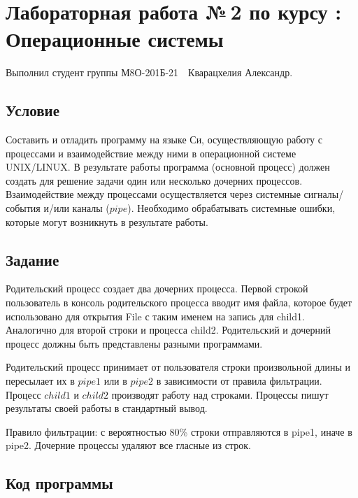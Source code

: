\documentclass[12pt]{article}
\begin{document}
	
	\section*{\centering Лабораторная работа №\,2 по курсу :\\ Операционные системы}
	
	Выполнил студент группы М8О-201Б-21 \,\, Кварацхелия Александр.
	
	\subsection*{Условие}
	
	Составить и отладить программу на языке Си, осуществляющую работу с процессами и
	взаимодействие между ними в операционной системе UNIX/LINUX. В результате работы
	программа (основной процесс) должен создать для решение задачи один или несколько
	дочерних процессов. Взаимодействие между процессами осуществляется через системные
	сигналы/события и/или каналы ($pipe$).
	Необходимо обрабатывать системные ошибки, которые могут возникнуть в результате работы.
	
	\subsection*{Задание}
	
	Родительский процесс создает два дочерних процесса. Первой строкой пользователь в консоль
	родительского процесса вводит имя файла, которое будет использовано для открытия File с таким
	именем на запись для child1. Аналогично для второй строки и процесса child2. Родительский и
	дочерний процесс должны быть представлены разными программами.
	
	\par 
	
	Родительский процесс принимает от пользователя строки произвольной длины и пересылает их в
	$pipe1$ или в $pipe2$ в зависимости от правила фильтрации. Процесс $child1$ и $child2$ производят работу
	над строками. Процессы пишут результаты своей работы в стандартный вывод.
	
	\par 
	
	Правило фильтрации: с вероятностью 80\% строки отправляются в pipe1, иначе в pipe2.
	Дочерние процессы удаляют все гласные из строк.
	
	\subsection*{Код программы}
	
\end{document}
